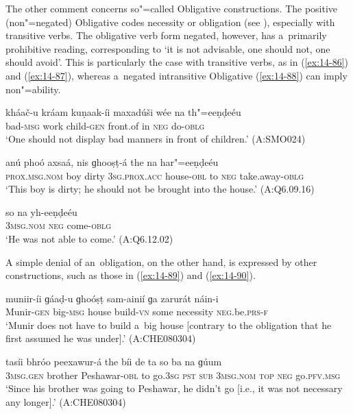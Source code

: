 The other comment concerns so"=called Obligative constructions. The positive (non"=negated) Obligative codes necessity or obligation (see ), especially with transitive verbs. The obligative verb form negated, however, has a~primarily prohibitive reading, corresponding to `it is not advisable, one should not, one should avoid'. This is particularly the case with transitive verbs, as in (\ref{ex:14-86}) and (\ref{ex:14-87}), whereas a~negated intransitive Obligative (\ref{ex:14-88}) can imply non"=ability.

\begin{exe}
\ex
\label{ex:14-86}
\gll kháač-u kráam kuṇaak-íi maxadúši wée na  th"=eeṇḍeéu \\
bad-\textsc{msg} work child-\textsc{gen} front.of in \textsc{neg} do-\textsc{oblg } \\
\glt `One should not display bad manners in front of children.' (A:SMO024)

\ex
\label{ex:14-87}
\gll anú phoó axsaá, nis ɡhooṣṭ-á  the na har"=eeṇḍeéu \\
\textsc{prox.msg.nom} boy dirty \textsc{3sg.prox.acc} house-\textsc{obl}  to \textsc{neg} take.away-\textsc{oblg}\\
\glt `This boy is dirty; he should not be brought into the house.' (A:Q6.09.16)

\ex
\label{ex:14-88}
\gll so na yh-eeṇḍeéu \\
\textsc{3msg}.\textsc{nom} \textsc{neg} come-\textsc{oblg}  \\
\glt `He was not able to come.' (A:Q6.12.02)
\end{exe}

A simple denial of an~obligation, on the other hand, is expressed by other constructions, such as those in (\ref{ex:14-89}) and (\ref{ex:14-90}).

\begin{exe}
\ex
\label{ex:14-89}
\gll muniir-íi ɡáaḍ-u ɡhoóṣṭ sam-ainií ɡa zarurát  náin-i \\
Munir-\textsc{gen} big-\textsc{msg} house build-\textsc{vn} some necessity  \textsc{neg.}be.\textsc{prs}-\textsc{f } \\
\glt `Munir does not have to build a~big house [contrary to the obligation that he first assumed he was under].' (A:CHE080304)

\ex
\label{ex:14-90}
\gll tasíi bhróo peexawur-á the bíi de ta so ba na ɡúum \\
\textsc{3msg}.\textsc{gen} brother Peshawar-\textsc{obl} to go.\textsc{3sg} \textsc{pst} \textsc{sub}  \textsc{3msg.nom} \textsc{top} \textsc{neg} go.\textsc{pfv.msg } \\
\glt `Since his brother was going to Peshawar, he didn't go [i.e., it was not necessary any longer].' (A:CHE080304)
\end{exe}

